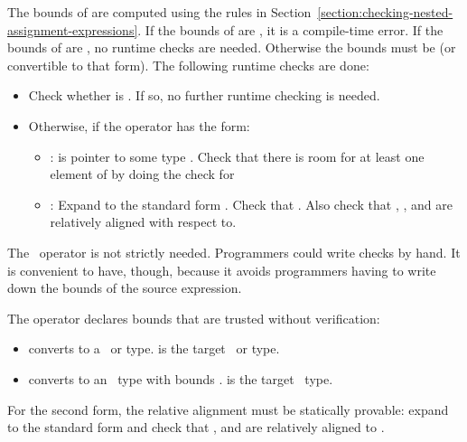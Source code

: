The bounds of  are computed
using the rules in Section~\ref{section:checking-nested-assignment-expressions}.
If the bounds of  are \boundsunknown, it is a compile-time error. 
If the bounds of  are \boundsany, no runtime checks are needed.
Otherwise the bounds must be  (or convertible to that form).
The following runtime checks are done:
\begin{itemize}
\item Check whether  is .  If so, no further runtime checking
is needed.
\item Otherwise, if the operator has the form:
\begin{itemize}
\item
  :  is pointer to some type .
  Check that there is room for at least one element of  by doing
  the check for 
\item
  :
   Expand  to the standard
   form .
   Check that   \code{<=}  \code{&&}  \code{<=} .
   Also check that , , and  are relatively aligned 
   with respect to.
\end{itemize}
\end{itemize}
The \dynamicboundscast\ operator is not strictly needed.
Programmers could write checks by hand. It is convenient to have, though,
because it avoids programmers having to write down the bounds of the source expression.

The operator  declares bounds that are trusted
without verification:
\begin{itemize}
\item
  converts  to a \ptr\ or \code{*} type.  is the target \ptr\ or \code{*} type.
\item
  converts  to an \arrayptr\ type with bounds .   is the
  target \arrayptr\ type.
\end{itemize}
For the second form, the relative alignment must be statically
provable: expand  to the standard form
 and check
that ,  and  are relatively aligned to .

